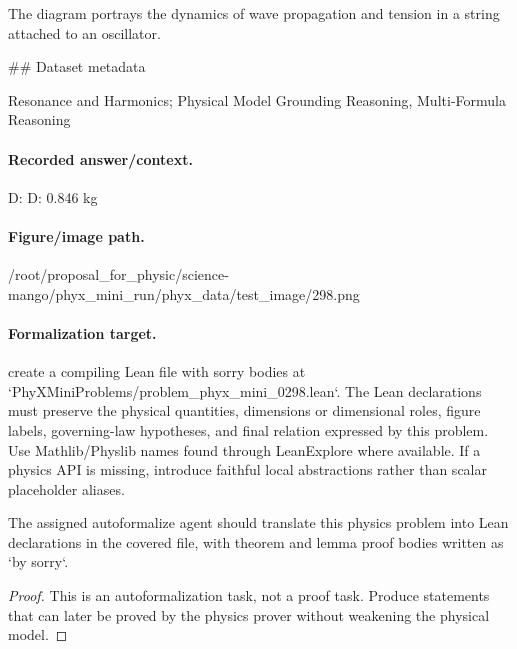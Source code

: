 The diagram portrays the dynamics of wave propagation and tension in a string attached to an oscillator.

\#\# Dataset metadata

Resonance and Harmonics; Physical Model Grounding Reasoning, Multi-Formula Reasoning

\paragraph{Recorded answer/context.}
D: D: 0.846 kg

\paragraph{Figure/image path.}
/root/proposal\_for\_physic/science-mango/phyx\_mini\_run/phyx\_data/test\_image/298.png

\paragraph{Formalization target.}
create a compiling Lean file with sorry bodies at `PhyXMiniProblems/problem\_phyx\_mini\_0298.lean`. The Lean declarations must preserve the physical quantities, dimensions or dimensional roles, figure labels, governing-law hypotheses, and final relation expressed by this problem.
Use Mathlib/Physlib names found through LeanExplore where available. If a physics API is missing, introduce faithful local abstractions rather than scalar placeholder aliases.

\begin{theorem}
\label{thm:physics:phyx_mini_0298:target}
The assigned autoformalize agent should translate this physics problem into Lean declarations in the covered file, with theorem and lemma proof bodies written as `by sorry`.
\end{theorem}
\begin{proof}
This is an autoformalization task, not a proof task. Produce statements that can later be proved by the physics prover without weakening the physical model.
\end{proof}

